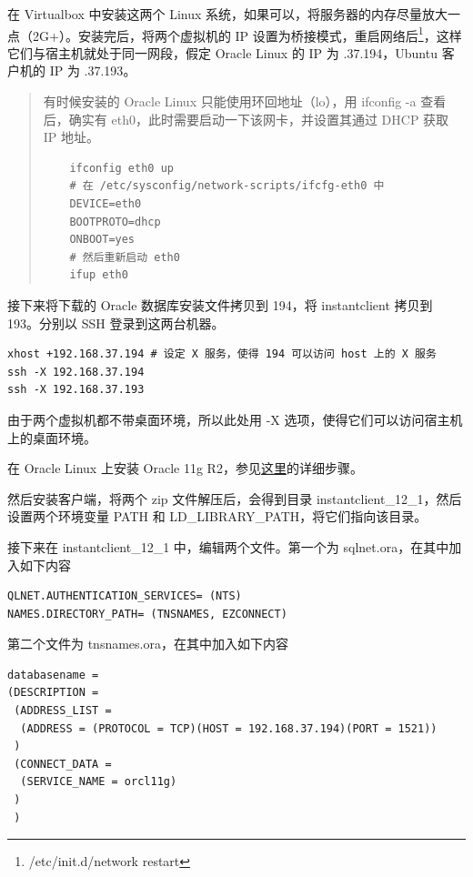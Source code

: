 在 Virtualbox 中安装这两个 Linux 系统，如果可以，将服务器的内存尽量放大一点（2G+）。安装完后，将两个虚拟机的 IP 设置为桥接模式，重启网络后\footnote{\cf /etc/init.d/network restart}，这样它们与宿主机就处于同一网段，假定 Oracle Linux 的 IP 为 {.37.194}，Ubuntu 客户机的 IP 为 {.37.193}。

\begin{quote}
有时候安装的 Oracle Linux 只能使用环回地址（lo），用 {\cmdf ifconfig -a} 查看后，确实有 {\cf eth0}，此时需要启动一下该网卡，并设置其通过 DHCP 获取 IP 地址。

    \begin{lstlisting}
    ifconfig eth0 up
    # 在 /etc/sysconfig/network-scripts/ifcfg-eth0 中
    DEVICE=eth0
    BOOTPROTO=dhcp
    ONBOOT=yes
    # 然后重新启动 eth0
    ifup eth0
    \end{lstlisting}

\end{quote}

接下来将下载的 Oracle 数据库安装文件拷贝到 194，将 instantclient 拷贝到 193。分别以 SSH 登录到这两台机器。

\begin{lstlisting}
xhost +192.168.37.194 # 设定 X 服务，使得 194 可以访问 host 上的 X 服务
ssh -X 192.168.37.194
ssh -X 192.168.37.193
\end{lstlisting}

由于两个虚拟机都不带桌面环境，所以此处用 {\cf -X} 选项，使得它们可以访问宿主机上的桌面环境。

在 Oracle Linux 上安装 Oracle 11g R2，参见\href{http://www.oracle-base.com/articles/11g/oracle-db-11gr2-installation-on-oracle-linux-6.php}{这里}的详细步骤。

然后安装客户端，将两个 zip 文件解压后，会得到目录 {\ff instantclient\_12\_1}，然后设置两个环境变量 {\cf PATH} 和 {\cf LD\_LIBRARY\_PATH}，将它们指向该目录。

接下来在 {\cf instantclient\_12\_1} 中，编辑两个文件。第一个为 {\ff sqlnet.ora}，在其中加入如下内容

\begin{lstlisting}
QLNET.AUTHENTICATION_SERVICES= (NTS)
NAMES.DIRECTORY_PATH= (TNSNAMES, EZCONNECT)
\end{lstlisting}

第二个文件为 {\ff tnsnames.ora}，在其中加入如下内容

\begin{lstlisting}
databasename =
(DESCRIPTION =
 (ADDRESS_LIST =
  (ADDRESS = (PROTOCOL = TCP)(HOST = 192.168.37.194)(PORT = 1521))
 )
 (CONNECT_DATA =
  (SERVICE_NAME = orcl11g)
 )
 )
\end{lstlisting}

